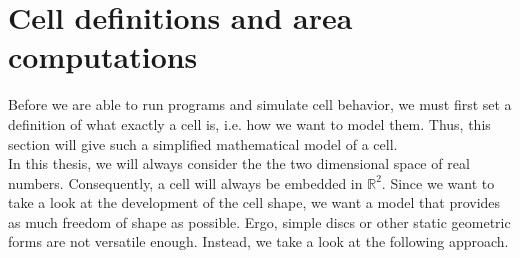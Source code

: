 \documentclass[a4paper,12pt,leqno]{article}
\theoremstyle{plain}
\theoremstyle{remark}
\newcommand{\R}{\mathbb{R}}
\begin{document}
\section{Cell definitions and area computations} \label{sec:CellDef}
Before we are able to run programs and simulate cell behavior, we must first set a definition of what exactly a cell is, i.e. how we want to model them. Thus, this section will give such a simplified mathematical model of a cell. \\
In this thesis, we will always consider the the two dimensional space of real numbers. Consequently, a cell will always be embedded in $\R^2$. 
Since we want to take a look at the development of the cell shape, we want a model that provides as much freedom of shape as possible. Ergo, simple discs or other static geometric forms are not versatile enough. Instead, we take a look at the following approach. \\
\end{document}
